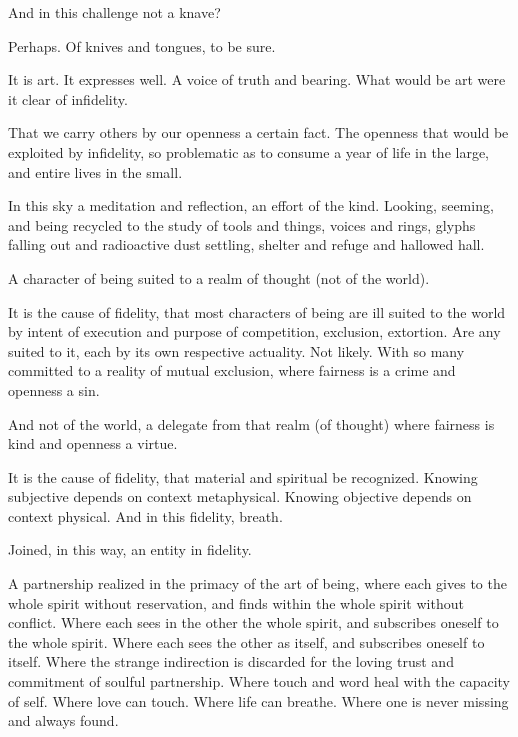 And in this challenge not a knave?

Perhaps.  Of knives and tongues, to be sure.

It is art.  It expresses well.  A voice of truth and bearing.  What
would be art were it clear of infidelity.

That we carry others by our openness a certain fact.  The openness
that would be exploited by infidelity, so problematic as to consume a
year of life in the large, and entire lives in the small.

\break

﻿In this sky a meditation and reflection, an effort of the kind.
Looking, seeming, and being recycled to the study of tools and things,
voices and rings, glyphs falling out and radioactive dust settling,
shelter and refuge and hallowed hall.

A character of being suited to a realm of thought (not of the world).

It is the cause of fidelity, that most characters of being are ill
suited to the world by intent of execution and purpose of competition,
exclusion, extortion.  Are any suited to it, each by its own
respective actuality.  Not likely.  With so many committed to a
reality of mutual exclusion, where fairness is a crime and openness a
sin.

And not of the world, a delegate from that realm (of thought) where
fairness is kind and openness a virtue.

It is the cause of fidelity, that material and spiritual be
recognized.  Knowing subjective depends on context metaphysical.
Knowing objective depends on context physical.  And in this fidelity,
breath.

Joined, in this way, an entity in fidelity.  

A partnership realized in the primacy of the art of being, where each
gives to the whole spirit without reservation, and finds within the
whole spirit without conflict.  Where each sees in the other the whole
spirit, and subscribes oneself to the whole spirit.  Where each sees
the other as itself, and subscribes oneself to itself.  Where the
strange indirection is discarded for the loving trust and commitment
of soulful partnership.  Where touch and word heal with the capacity
of self.  Where love can touch.  Where life can breathe.  Where one is
never missing and always found.

\bye
